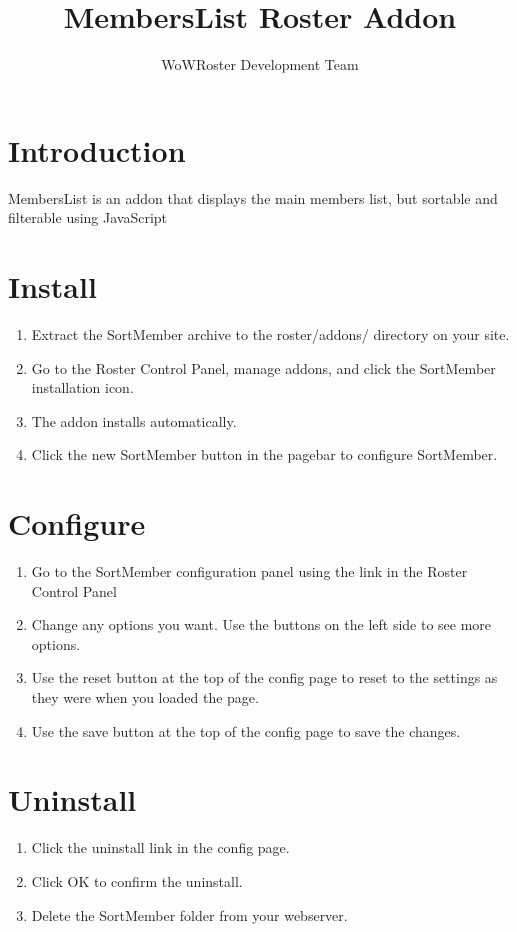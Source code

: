 \documentclass[12pt, a4paper]{article}
\title{MembersList Roster Addon}
\author{WoWRoster Development Team}
\begin{document}
\maketitle

\section{Introduction}
MembersList is an addon that displays the main members list, but sortable and
filterable using JavaScript

\section{Install}
\begin{enumerate}
\item Extract the SortMember archive to the roster/addons/ directory on your site.

\item Go to the Roster Control Panel, manage addons, and click the SortMember
   installation icon.

\item The addon installs automatically. 

\item Click the new SortMember button in the pagebar to configure SortMember.
\end{enumerate}

\section{Configure}
\begin{enumerate}
\item Go to the SortMember configuration panel using the link in the Roster Control
   Panel

\item Change any options you want. Use the buttons on the left side to see more
   options.

\item Use the reset button at the top of the config page to reset to the settings
   as they were when you loaded the page.

\item Use the save button at the top of the config page to save the changes.
\end{enumerate}

\section{Uninstall}
\begin{enumerate}
\item Click the uninstall link in the config page.

\item Click OK to confirm the uninstall.

\item Delete the SortMember folder from your webserver.
\end{enumerate}
\end{document}
